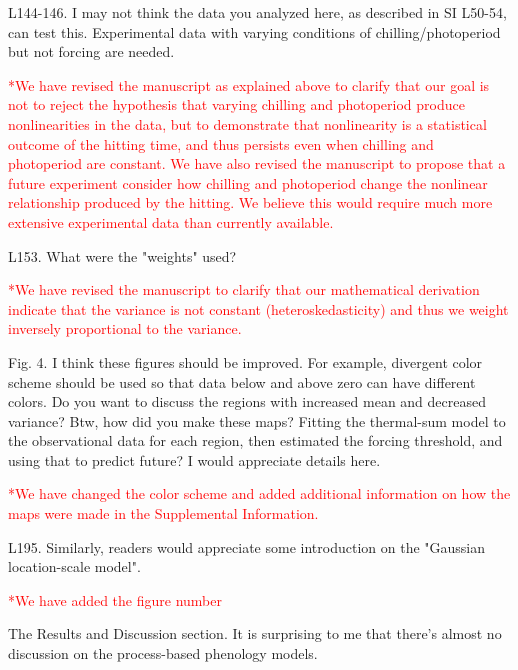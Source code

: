 \documentclass{article}
\begin{document}
L144-146. I may not think the data you analyzed here, as described in SI L50-54, can test this. Experimental data with varying conditions of chilling/photoperiod but not forcing are needed.

\textcolor{red}{*We have revised the manuscript as explained above to clarify that our goal is not to reject the hypothesis that varying chilling and photoperiod produce nonlinearities in the data, but to demonstrate that nonlinearity is a statistical outcome of the hitting time, and thus persists even when chilling and photoperiod are constant. We have also revised the manuscript to propose that a future experiment consider how chilling and photoperiod change the nonlinear relationship produced by the hitting. We believe this would require much more extensive experimental data than currently available.}

L153. What were the "weights" used?

\textcolor{red}{*We have revised the manuscript to clarify that our mathematical derivation indicate that the variance is not constant (heteroskedasticity) and thus we weight inversely proportional to the variance.}

Fig. 4. I think these figures should be improved. For example, divergent color scheme should be used so that data below and above zero can have different colors. Do you want to discuss the regions with increased mean and decreased variance? Btw, how did you make these maps? Fitting the thermal-sum model to the observational data for each region, then estimated the forcing threshold, and using that to predict future? I would appreciate details here.


\textcolor{red}{*We have changed the color scheme and added additional information on how the maps were made in the Supplemental Information.}

L195. Similarly, readers would appreciate some introduction on the "Gaussian location-scale model".

\textcolor{red}{*We have added the figure number}

The Results and Discussion section. It is surprising to me that there's almost no discussion on the process-based phenology models.
\end{document}
